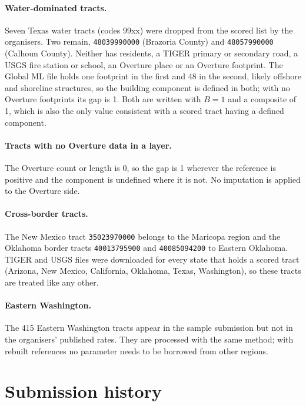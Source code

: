 \documentclass[11pt]{article}
\begin{document}
\paragraph{Water-dominated tracts.} Seven Texas water tracts (codes 99xx) were
dropped from the scored list by the organisers. Two remain,
\texttt{48039990000} (Brazoria County) and \texttt{48057990000} (Calhoun
County). Neither has residents, a TIGER primary or secondary road, a USGS
fire station or school, an Overture place or an Overture footprint. The
Global ML file holds one footprint in the first and 48 in the second, likely
offshore and shoreline structures, so the building component is defined in
both; with no Overture footprints its gap is 1. Both are written with $B = 1$
and a composite of 1, which is also the only value consistent with a scored
tract having a defined component.

\paragraph{Tracts with no Overture data in a layer.} The Overture count or
length is 0, so the gap is 1 wherever the reference is positive and the
component is undefined where it is not. No imputation is applied to the
Overture side.

\paragraph{Cross-border tracts.} The New Mexico tract \texttt{35023970000}
belongs to the Maricopa region and the Oklahoma border tracts
\texttt{40013795900} and \texttt{40085094200} to Eastern Oklahoma. TIGER and
USGS files were downloaded for every state that holds a scored tract (Arizona,
New Mexico, California, Oklahoma, Texas, Washington), so these tracts are
treated like any other.

\paragraph{Eastern Washington.} The 415 Eastern Washington tracts appear in
the sample submission but not in the organisers' published rates. They are
processed with the same method; with rebuilt references no parameter needs
to be borrowed from other regions.

\section{Submission history}
\label{sec:history}
\end{document}
